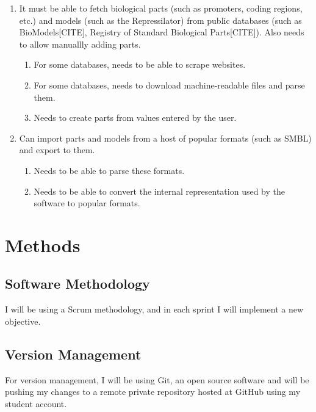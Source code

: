 \documentclass{article}
\begin{document}
\begin{enumerate}
			\item It must be able to fetch biological parts (such as promoters, coding regions, etc.) and models (such as the Repressilator) from public databases (such as BioModels[CITE], Registry of Standard Biological Parts[CITE]). Also needs to allow manuallly adding parts.
			\begin{enumerate}
				\item For some databases, needs to be able to scrape websites.
				\item For some databases, needs to download machine-readable files and parse them.
				\item Needs to create parts from values entered by the user.
			\end{enumerate}
			
			\item Can import parts and models from a host of popular formats (such as SMBL) and export to them.
			\begin{enumerate}
				\item Needs to be able to parse these formats.
				\item Needs to be able to convert the internal representation used by the software to popular formats.
			\end{enumerate}
	
		\end{enumerate}
	
	\section{Methods}
	
	\subsection{Software Methodology}
	\par I will be using a Scrum methodology, and in each sprint I will implement a new objective.

		
	\subsection{Version Management}
	\par For version management, I will be using Git, an open source software and will be pushing my changes to a remote private repository hosted at GitHub using my student account.
	
\end{document}
